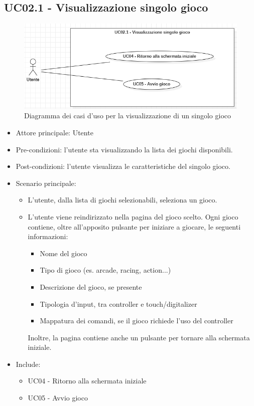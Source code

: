 \subsection{UC02.1 - Visualizzazione singolo gioco}
\begin{figure}[h]
    \centering
    \includegraphics[width=400pt]{images/usecase/UC02_1.png}
    \caption{Diagramma dei casi d'uso per la visualizzazione di un singolo gioco}
    \label{fig:UC02.1}
\end{figure}
\begin{itemize}
    \item Attore principale: Utente
    \item Pre-condizioni: l'utente sta visualizzando la lista dei giochi disponibili.
    \item Post-condizioni: l'utente visualizza le caratteristiche del singolo gioco.
    \item Scenario principale: \begin{itemize}
        \item L'utente, dalla lista di giochi selezionabili, seleziona un gioco.
        \item L'utente viene reindirizzato nella pagina del gioco scelto. Ogni gioco contiene, oltre all'apposito pulsante per iniziare a giocare, le seguenti informazioni: \begin{itemize}
            \item Nome del gioco
            \item Tipo di gioco (es. arcade, racing, action...)
            \item Descrizione del gioco, se presente
            \item Tipologia d'input, tra controller e touch/digitalizer
            \item Mappatura dei comandi, se il gioco richiede l'uso del controller
        \end{itemize} Inoltre, la pagina contiene anche un pulsante per tornare alla schermata iniziale.
    \end{itemize}
    \item Include: \begin{itemize}
        \item UC04 - Ritorno alla schermata iniziale
        \item UC05 - Avvio gioco
    \end{itemize}
\end{itemize}
\newpage
